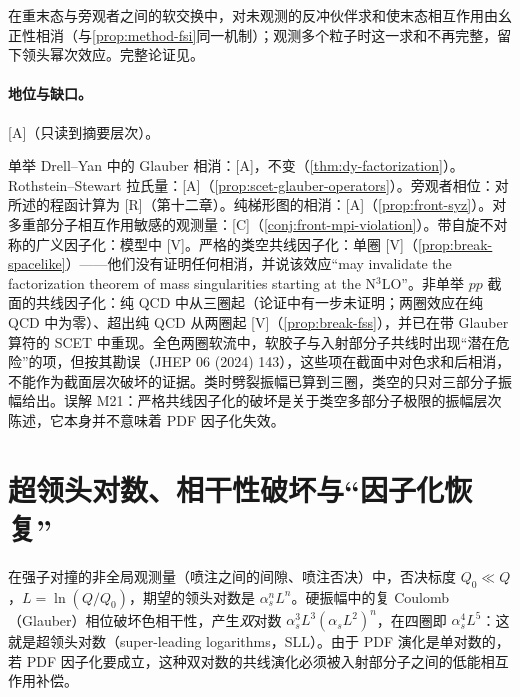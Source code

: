 \begin{proofsketch}
在重末态与旁观者之间的软交换中，对未观测的反冲伙伴求和使末态相互作用由幺正性相消（与\cref{prop:method-fsi}同一机制）；观测多个粒子时这一求和不再完整，留下领头幂次效应。完整论证见\cite{Mitov:2012gt}。
\end{proofsketch}

\paragraph{地位与缺口。}[A]（只读到摘要层次）。

\begin{remark}\label{rem:front-glauber-status}
单举 Drell--Yan 中的 Glauber 相消：[A]，不变（\cref{thm:dy-factorization}）。Rothstein--Stewart 拉氏量：[A]（\cref{prop:scet-glauber-operators}）。旁观者相位：对所述的程函计算为 [R]（第十二章）。纯梯形图的相消：[A]（\cref{prop:front-syz}）。对多重部分子相互作用敏感的观测量：[C]（\cref{conj:front-mpi-violation}）。带自旋不对称的广义因子化：模型中 [V]。严格的类空共线因子化：单圈 [V]\cite{CataniDeFlorianRodrigo2012}（\cref{prop:break-spacelike}）——他们没有证明任何相消，并说该效应“may invalidate the factorization theorem of mass singularities starting at the N$^3$LO”。非单举 $pp$ 截面的共线因子化：纯 QCD 中从三圈起（论证中有一步未证明；两圈效应在纯 QCD 中为零）、超出纯 QCD 从两圈起 [V]\cite{ForshawSeymourSiodmok2012}（\cref{prop:break-fss}），并已在带 Glauber 算符的 SCET 中重现\cite{Schwartz:2017nmr}。全色两圈软流中，软胶子与入射部分子共线时出现“潜在危险”的项\cite{Dixon:2019lnw}，但按其勘误（JHEP 06 (2024) 143），这些项在截面中对色求和后相消，不能作为截面层次破坏的证据。类时劈裂振幅已算到三圈，类空的只对三部分子振幅给出\cite{Guan:2024hlf}。误解 M21：严格共线因子化的破坏是关于类空多部分子极限的振幅层次陈述，它本身并不意味着 PDF 因子化失效。
\end{remark}

\section{超领头对数、相干性破坏与“因子化恢复”}\label{sec:front-sll}

在强子对撞的非全局观测量（喷注之间的间隙、喷注否决）中，否决标度 $Q_0\ll Q$，$L=\ln(Q/Q_0)$，期望的领头对数是 $\alpha_s^nL^n$。硬振幅中的复 Coulomb（Glauber）相位破坏色相干性，产生\emph{双}对数 $\alpha_s^3L^3(\alpha_sL^2)^n$，在四圈即 $\alpha_s^4L^5$：这就是超领头对数（super-leading logarithms，SLL）。由于 PDF 演化是单对数的，若 PDF 因子化要成立，这种双对数的共线演化必须被入射部分子之间的低能相互作用补偿。

